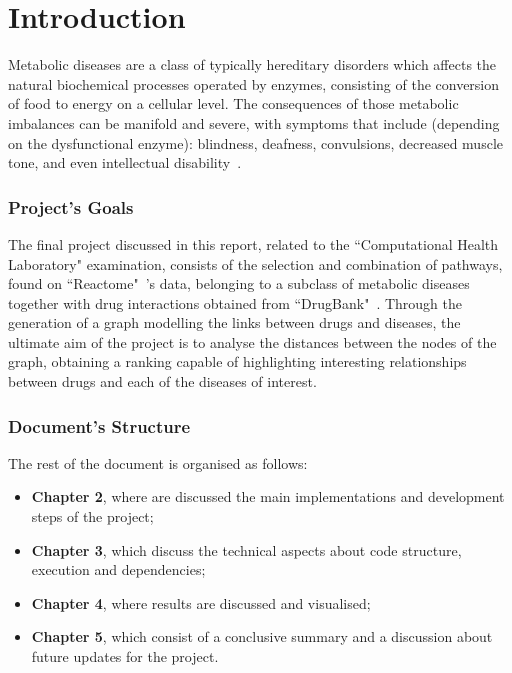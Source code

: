 \chapter{Introduction}\label{chap:intro}

Metabolic diseases are a class of typically hereditary disorders which affects the natural biochemical processes operated by enzymes, consisting of the conversion of food to energy on a cellular level. The consequences of those metabolic imbalances can be manifold and severe, with symptoms that include (depending on the dysfunctional enzyme): blindness, deafness, convulsions, decreased muscle tone, and even intellectual disability~\cite{britannica}.

\subsection{Project's Goals}

The final project discussed in this report, related to the ``Computational Health Laboratory" examination, consists of the selection and combination of pathways, found on ``Reactome"~\cite{reactome}'s data, belonging to a subclass of metabolic diseases together with drug interactions obtained from ``DrugBank"~\cite{drugbank}. Through the generation of a graph modelling the links between drugs and diseases, the ultimate aim of the project is to analyse the distances between the nodes of the graph, obtaining a ranking capable of highlighting interesting relationships between drugs and each of the diseases of interest.

\subsection{Document's Structure}
The rest of the document is organised as follows:
\begin{itemize}
\item \textbf{Chapter 2}, where are discussed the main implementations and development steps of the project;
\item \textbf{Chapter 3}, which discuss the technical aspects about code structure, execution and dependencies;
\item \textbf{Chapter 4}, where results are discussed and visualised;
\item \textbf{Chapter 5}, which consist of a conclusive summary and a discussion about future updates for the project.
\end{itemize}